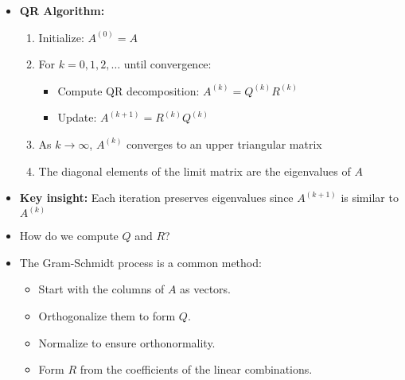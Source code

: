 \begin{frame}
    \begin{itemize}
        \item \textbf{QR Algorithm:}
        \begin{enumerate}
            \item Initialize: $A^{(0)} = A$
            \item For $k = 0, 1, 2, \ldots$ until convergence:
            \begin{itemize}
                \item Compute QR decomposition: $A^{(k)} = Q^{(k)} R^{(k)}$
                \item Update: $A^{(k+1)} = R^{(k)} Q^{(k)}$
            \end{itemize}
            \item As $k \to \infty$, $A^{(k)}$ converges to an upper triangular matrix
            \item The diagonal elements of the limit matrix are the eigenvalues of $A$
        \end{enumerate}
        \item \textbf{Key insight:} Each iteration preserves eigenvalues since $A^{(k+1)}$ is similar to $A^{(k)}$
    \end{itemize}
\end{frame}

\begin{frame}
    \begin{itemize}
        \item How do we compute $Q$ and $R$?
        \item The Gram-Schmidt process is a common method:
        \begin{itemize}
            \item Start with the columns of $A$ as vectors.
            \item Orthogonalize them to form $Q$.
            \item Normalize to ensure orthonormality.
            \item Form $R$ from the coefficients of the linear combinations.   
    \end{itemize}
\end{itemize}
\end{frame}
\begin{frame}
    
\end{frame}